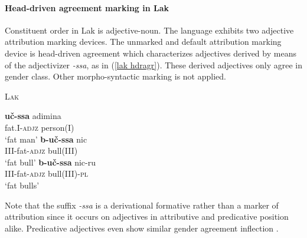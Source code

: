 \paragraph{Head-driven agreement marking in Lak}
Constituent order in Lak is adjective-noun. The language exhibits two adjective attribution marking devices. The unmarked and default attribution marking device is head-driven agreement which characterizes adjectives derived by means of the adjectivizer \mbox{\textit{-ssa}}, as in (\ref{lak hdragr}). These derived adjectives only agree in gender class. Other morpho-syntactic marking is not applied.
\begin{exe}
\ex \textsc{Lak} \cite[48]{zirkov1955} \label{lak hdragr}
\begin{xlist}
\ex 
\gll	\textbf{uč-ssa} adimina\\
	fat.\textsc{I}-\textsc{adjz} person(\textsc{I})\\
\glt	‘fat man’
\gll	\textbf{b-uč-ssa} nic\\
	\textsc{III}-fat-\textsc{adjz} bull\textsc{(III)}\\
\glt	‘fat bull’
\ex
\gll	\textbf{b-uč-ssa} nic-ru\\
	\textsc{III}-fat-\textsc{adjz} bull\textsc{(III)}-\textsc{pl}\\
\glt	‘fat bulls’
\end{xlist}
\end{exe}
Note that the suffix \textit{-ssa} is a derivational formative rather than a marker of attribution since it occurs on adjectives in attributive and predicative position alike. Predicative adjectives even show similar gender agreement inflection \citep[45–51]{zirkov1955}.

